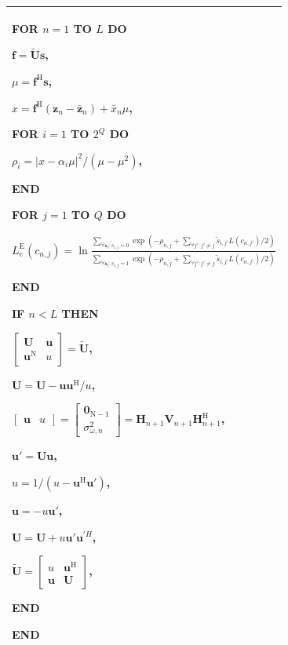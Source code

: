 \begin{longtable}{l}
\begin{minipage}[tb]{15cm}
     \quad FOR $n=1$ TO $L$ DO

     \qquad $\mathbf{f}=\tilde{\mathbf{U}}\mathbf{s}$,
     
     \qquad $\mu=\mathbf{f}^{\mathrm{H}}\mathbf{s}$,

     \qquad  $x=\mathbf{f}^{\mathrm{H}}(\mathbf{z}_n-\bar{\mathbf{z}}_n)+\bar{x}_n\mu$,

     \quad FOR $i=1$ TO $2^Q$ DO

     \qquad $\rho_i=|x-\alpha_i\mu|^2/(\mu-\mu^2)$,

     \quad END

     \quad FOR $j=1$ TO $Q$ DO

     \qquad $ L_e^{\mathrm{E}}(c_{n,j})=\ln\frac{\displaystyle\sum_{\forall
         \mathbf{s}_i:s_{i,j}=0}\exp\left(-\rho_{n,j}+\sum_{\forall
         {j}':{j}'\neq j}\tilde{s}_{i,{j}'}L(c_{n,{j}'})/2\right
         )}{\displaystyle\sum_{\forall
         \mathbf{s}_i:s_{i,j}=1}\exp\left(-\rho_{n,j}+\sum_{\forall
         {j}':{j}'\neq j}\tilde{s}_{i,{j}'}L(c_{n,{j}'})/2\right)}$
         
         \quad END

     \quad IF $n<L$ THEN

     \qquad
     $\begin{bmatrix}\mathbf{U}&\mathbf{u}\\\mathbf{u}^{\mathrm{N}}&u\end{bmatrix}=\tilde{\mathbf{U}}$,

     \qquad    $\mathbf{U}=\mathbf{U}-\mathbf{u}\mathbf{u}^{\mathrm{H}}/u$,

     \qquad
     $\begin{bmatrix}\mathbf{u}&u\end{bmatrix}=\begin{bmatrix}\mathbf{0}_{\mathrm{N}-1}\\\sigma_{\omega,n}^2\end{bmatrix}=\mathbf{H}_{n+1}\mathbf{V}_{n+1}\mathbf{H}_{n+1}^{\mathrm{H}}$,

        \qquad ${\mathbf{u}}'=\mathbf{U}\mathbf{u}$,

       \qquad  $u=1/(u-\mathbf{u}^{\mathrm{H}}{\mathbf{u}}')$,

       \qquad  $\mathbf{u}=-u{\mathbf{u}}'$,

       \qquad  $\mathbf{U}=\mathbf{U}+u{\mathbf{u}}'{\mathbf{u}}^{'H}$,

       \qquad  $\tilde{\mathbf{U}}=\begin{bmatrix}u &
             \mathbf{u}^{\mathrm{H}}\\\mathbf{u}& \mathbf{U}\end{bmatrix}$,

        \quad     END

         \quad    END
     \vspace{5mm}
 \end{minipage}\\
    \hline
\end{longtable}
